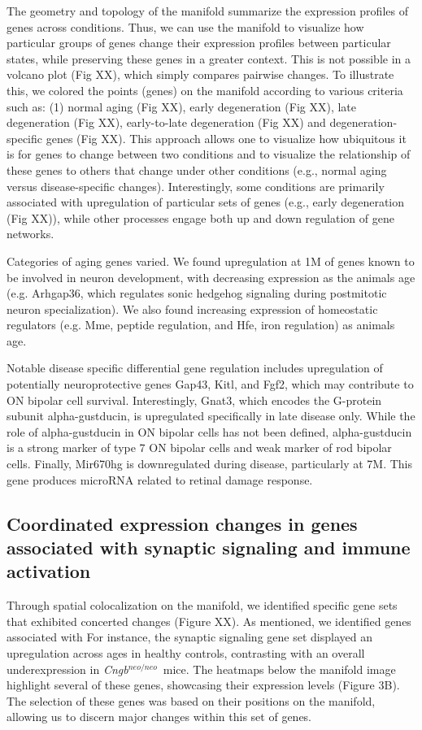 \documentclass[11pt, a4paper]{article}
\newcommand{\cngb}{\textit{Cngb$^{neo/neo}$}~}
\begin{document}
The geometry and topology of the manifold summarize the expression profiles of genes across conditions. Thus, we can use the manifold to visualize how particular groups of genes change their expression profiles between particular states, while preserving these genes in a greater context. This is not possible in a volcano plot (Fig XX), which simply compares pairwise changes. To illustrate this, we colored the points (genes) on the manifold according to various criteria such as: (1) normal aging (Fig XX), early degeneration (Fig XX), late degeneration (Fig XX), early-to-late degeneration (Fig XX) and degeneration-specific genes (Fig XX). This approach allows one to visualize how ubiquitous it is for genes to change between two conditions and to visualize the relationship of these genes to others that change under other conditions (e.g., normal aging versus disease-specific changes). Interestingly, some conditions are primarily associated with upregulation of particular sets of genes (e.g., early degeneration (Fig XX)), while other processes engage both up and down regulation of gene networks.   

Categories of aging genes varied. We found upregulation at 1M of genes known to be involved in neuron development, with decreasing expression as the animals age (e.g. Arhgap36, which regulates sonic hedgehog signaling during postmitotic neuron specialization). We also found increasing expression of homeostatic regulators (e.g. Mme, peptide regulation,  and Hfe, iron regulation) as animals age. 

Notable disease specific differential gene regulation includes upregulation of potentially neuroprotective genes Gap43, Kitl, and Fgf2, which may contribute to ON bipolar cell survival. Interestingly, Gnat3, which encodes the G-protein subunit alpha-gustducin, is upregulated specifically in late disease only. While the role of alpha-gustducin in ON bipolar cells has not been defined, alpha-gustducin is a strong marker of type 7 ON bipolar cells and weak marker of rod bipolar cells.  Finally, Mir670hg is downregulated during disease, particularly at 7M. This gene produces microRNA related to retinal damage response. 
\subsection*{Coordinated expression changes in genes associated with synaptic signaling and immune activation}

Through spatial colocalization on the manifold, we identified specific gene sets that exhibited concerted changes (Figure XX). As mentioned, we identified genes associated with 
For instance, the synaptic signaling gene set displayed an upregulation across ages in healthy controls, contrasting with an overall underexpression in \cngb mice. The heatmaps below the manifold image highlight several of these genes, showcasing their expression levels (Figure 3B). The selection of these genes was based on their positions on the manifold, allowing us to discern major changes within this set of genes.
\end{document}
